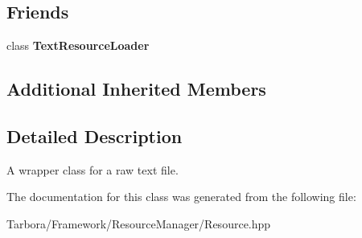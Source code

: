 \subsection*{Friends}
\begin{DoxyCompactItemize}
\item 
\mbox{\label{classTarbora_1_1Text_ad100d8767ed491d6e80636c2b83ac605}} 
class {\bfseries Text\+Resource\+Loader}
\end{DoxyCompactItemize}
\subsection*{Additional Inherited Members}


\subsection{Detailed Description}
A wrapper class for a raw text file. 

The documentation for this class was generated from the following file\+:\begin{DoxyCompactItemize}
\item 
Tarbora/\+Framework/\+Resource\+Manager/Resource.\+hpp\end{DoxyCompactItemize}
